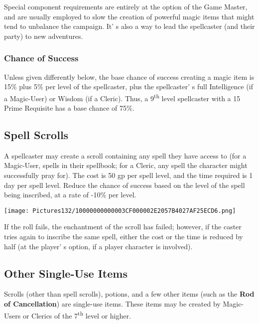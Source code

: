 \documentclass[a4paper,twoside,openany,10pt]{book}
\begin{document}
\begin{multicols}{2}
Special component requirements are entirely at the option of the Game Master, and are usually employed to slow the creation of powerful magic items that might tend to unbalance the campaign. It' s also a way to lead the spellcaster (and their party) to new adventures.

\subsubsection{Chance of Success}\label{chance-of-success}

Unless given differently below, the base chance of success creating a magic item is 15\% plus 5\% per level of the spellcaster, plus the spellcaster' s full Intelligence (if a Magic-User) or Wisdom (if a Cleric). Thus, a 9\textsuperscript{th} level spellcaster with a 15 Prime Requisite has a base chance of 75\%.

\subsection{Spell Scrolls}\label{spell-scrolls}

A spellcaster may create a scroll containing any spell they have access to (for a Magic-User, spells in their spellbook; for a Cleric, any spell the character might successfully pray for). The cost is 50 gp per spell level, and the time required is 1 day per spell level. Reduce the chance of success based on the level of the spell being inscribed, at a rate of -10\% per level.

\begin{center}
	\texttt{[image: Pictures132/10000000000003CF000002E2057B4027AF25ECD6.png]}
\end{center}

If the roll fails, the enchantment of the scroll has failed; however, if the caster tries again to inscribe the same spell, either the cost or the time is reduced by half (at the player' s option, if a player character is involved).

\subsection{Other Single-Use Items}\label{other-single-use-items}

Scrolls (other than spell scrolls), potions, and a few other items (such as the \textbf{Rod of Cancellation}) are single-use items. These items may be created by Magic-Users or Clerics of the 7\textsuperscript{th} level or higher.


\end{multicols}
\end{document}
